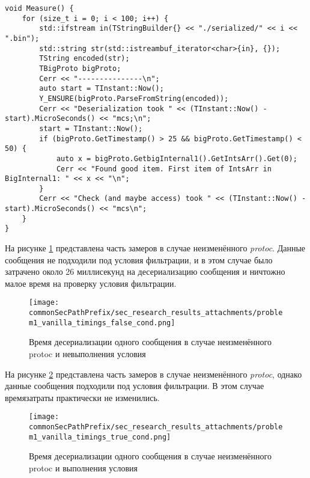 \noindent\begin{minipage}{\linewidth}
\begin{lstlisting}[style=CodeListing, caption={Функция Measure}, label=sec_research:code:problem1_measure]
void Measure() {
    for (size_t i = 0; i < 100; i++) {
        std::ifstream in(TStringBuilder{} << "./serialized/" << i << ".bin");
        std::string str(std::istreambuf_iterator<char>{in}, {});
        TString encoded(str);
        TBigProto bigProto;
        Cerr << "---------------\n";
        auto start = TInstant::Now();
        Y_ENSURE(bigProto.ParseFromString(encoded));
        Cerr << "Deserialization took " << (TInstant::Now() - start).MicroSeconds() << "mcs;\n";
        start = TInstant::Now();
        if (bigProto.GetTimestamp() > 25 && bigProto.GetTimestamp() < 50) {
            auto x = bigProto.GetbigInternal1().GetIntsArr().Get(0);
            Cerr << "Found good item. First item of IntsArr in BigInternal1: " << x << "\n";
        }
        Cerr << "Check (and maybe access) took " << (TInstant::Now() - start).MicroSeconds() << "mcs\n";
    }
}
\end{lstlisting}
\end{minipage}

На рисунке \ref{fig:problem1_vanilla_timings_false_cond} представлена часть замеров в случае неизменённого \textit{protoc}. 
Данные сообщения не подходили под условия фильтрации, и в этом случае было затрачено около 26 миллисекунд на десериализацию сообщения и ничтожно малое время на проверку условия фильтрации.

\begin{figure}[!ht]
    \centering
    \texttt{[image: \\commonSecPathPrefix/sec\_research\_results\_attachments/problem1\_vanilla\_timings\_false\_cond.png]}
    \caption{Время десериализации одного сообщения в случае неизменённого protoc и невыполнения условия}
    \label{fig:problem1_vanilla_timings_false_cond}
\end{figure}

\pagebreak
На рисунке \ref{fig:problem1_vanilla_timings_true_cond} представлена часть замеров в случае неизменённого \textit{protoc}, однако данные сообщения подходили под условия фильтрации. В этом случае времязатраты практически не изменились.

\begin{figure}[!ht]
    \centering
    \texttt{[image: \\commonSecPathPrefix/sec\_research\_results\_attachments/problem1\_vanilla\_timings\_true\_cond.png]}
    \caption{Время десериализации одного сообщения в случае неизменённого protoc и выполнения условия}
    \label{fig:problem1_vanilla_timings_true_cond}
\end{figure}

